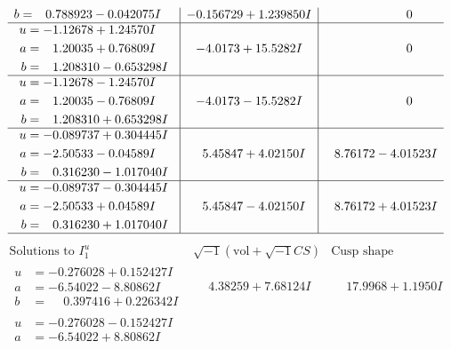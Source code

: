 \documentclass[1p]{elsarticle_modified}
\theoremstyle{definition}
\newcommand{\I}{\sqrt{-1}}
\begin{document}
$$\begin{array}{c|c|c}
\begin{aligned}
b &= \phantom{-}0.788923 - 0.042075 I\end{aligned}
 & -0.156729 + 1.239850 I & \phantom{-0.000000 } 0 \\ \hline\begin{aligned}
u &= -1.12678 + 1.24570 I \\
a &= \phantom{-}1.20035 + 0.76809 I \\
b &= \phantom{-}1.208310 - 0.653298 I\end{aligned}
 & -4.0173 + 15.5282 I & \phantom{-0.000000 } 0 \\ \hline\begin{aligned}
u &= -1.12678 - 1.24570 I \\
a &= \phantom{-}1.20035 - 0.76809 I \\
b &= \phantom{-}1.208310 + 0.653298 I\end{aligned}
 & -4.0173 - 15.5282 I & \phantom{-0.000000 } 0 \\ \hline\begin{aligned}
u &= -0.089737 + 0.304445 I \\
a &= -2.50533 - 0.04589 I \\
b &= \phantom{-}0.316230 - 1.017040 I\end{aligned}
 & \phantom{-}5.45847 + 4.02150 I & \phantom{-}8.76172 - 4.01523 I \\ \hline\begin{aligned}
u &= -0.089737 - 0.304445 I \\
a &= -2.50533 + 0.04589 I \\
b &= \phantom{-}0.316230 + 1.017040 I\end{aligned}
 & \phantom{-}5.45847 - 4.02150 I & \phantom{-}8.76172 + 4.01523 I\\
 \hline 
 \end{array}$$\newpage$$\begin{array}{c|c|c}  
\text{Solutions to }I^u_{1}& \I (\text{vol} + \sqrt{-1}CS) & \text{Cusp shape}\\
 \hline 
\begin{aligned}
u &= -0.276028 + 0.152427 I \\
a &= -6.54022 - 8.80862 I \\
b &= \phantom{-}0.397416 + 0.226342 I\end{aligned}
 & \phantom{-}4.38259 + 7.68124 I & \phantom{-}17.9968 + 1.1950 I \\ \hline\begin{aligned}
u &= -0.276028 - 0.152427 I \\
a &= -6.54022 + 8.80862 I \\

\end{aligned}
\end{array}$$
\end{document}
